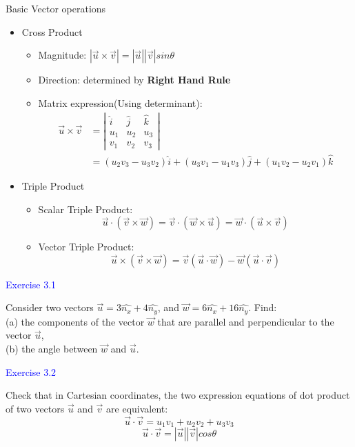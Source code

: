 \documentclass{beamer}
\begin{document}
\begin{frame}{Basic Vector operations}
  \begin{itemize}
    \item Cross Product
    \begin{itemize}
      \item Magnitude: $|\vec{u}\times \vec{v}|=|\vec{u}||\vec{v}|sin\theta$
      \item Direction: determined by \textbf{Right Hand Rule}
      \item Matrix expression(Using determinant):
      \begin{align*}
        \vec{u}\times \vec{v} &= \left|\begin{matrix}\hat{i}&\hat{j}&\hat{k}\\u_1 & u_2 & u_3\\ v_1 & v_2 & v_3 \end{matrix}\right|\\&=(u_2v_3-u_3v_2)\hat{i}+(u_3v_1-u_1v_3)\hat{j}+ (u_1v_2-u_2v_1)\hat{k}
 \end{align*}
    \end{itemize}\pause
    \item Triple Product
    \begin{itemize}
      \item Scalar Triple Product:$$\vec{u}\cdot(\vec{v}\times \vec{w})=\vec{v}\cdot(\vec{w}\times \vec{u})=\vec{w}\cdot(\vec{u}\times \vec{v})$$
      \item Vector Triple Product:$$\vec{u}\times (\vec{v}\times \vec{w})=\vec{v}(\vec{u}\cdot\vec{w})-\vec{w}(\vec{u}\cdot \vec{v})$$
    \end{itemize}
  \end{itemize}
\end{frame}

\begin{frame}
\textcolor{blue}{Exercise 3.1}

Consider two vectors $ \vec{u}= 3\hat{n_x} +4\hat{n_y}$, and $\vec{w}= 6\hat{n_x} +16\hat{n_y}$. Find:\\
(a) the components of the vector $\vec w$ that are parallel and perpendicular
to the vector $\vec u$,\\
(b) the angle between $\vec w$ and $\vec u$.
\end{frame}

\begin{frame}
\textcolor{blue}{Exercise 3.2}

Check that in Cartesian coordinates, the two expression equations
of dot product of two vectors $\vec{u}$ and $\vec{v}$ are equivalent:$$\vec{u}\cdot \vec{v} = u_1v_1 + u_2v_2 + u_3v_3$$
$$\vec{u}\cdot \vec{v} = |\vec{u}||\vec{v}|cos\theta$$
\end{frame}
\end{document}
